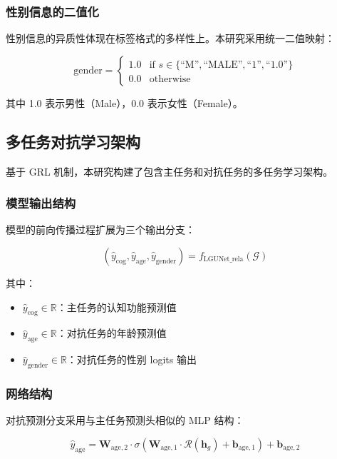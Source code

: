 \subsubsection{性别信息的二值化}

性别信息的异质性体现在标签格式的多样性上。本研究采用统一二值映射：

\begin{equation}
\text{gender} = \begin{cases}
1.0 & \text{if } s \in \{ \text{``M''}, \text{``MALE''}, \text{``1''}, \text{``1.0''} \} \\
0.0 & \text{otherwise}
\end{cases}
\end{equation}

其中 1.0 表示男性（Male），0.0 表示女性（Female）。

\subsection{多任务对抗学习架构}

基于 GRL 机制，本研究构建了包含主任务和对抗任务的多任务学习架构。

\subsubsection{模型输出结构}

模型的前向传播过程扩展为三个输出分支：

\begin{equation}
(\hat{y}_{\text{cog}}, \hat{y}_{\text{age}}, \hat{y}_{\text{gender}}) = f_{\text{LGUNet\_rela}}(\mathcal{G})
\end{equation}

其中：
\begin{itemize}
    \item $\hat{y}_{\text{cog}} \in \mathbb{R}$：主任务的认知功能预测值
    \item $\hat{y}_{\text{age}} \in \mathbb{R}$：对抗任务的年龄预测值
    \item $\hat{y}_{\text{gender}} \in \mathbb{R}$：对抗任务的性别 logits 输出
\end{itemize}

\subsubsection{网络结构}

对抗预测分支采用与主任务预测头相似的 MLP 结构：

\begin{equation}
\hat{y}_{\text{age}} = \mathbf{W}_{\text{age},2} \cdot \sigma\left( \mathbf{W}_{\text{age},1} \cdot \mathcal{R}(\mathbf{h}_g) + \mathbf{b}_{\text{age},1} \right) + \mathbf{b}_{\text{age},2}
\end{equation}

